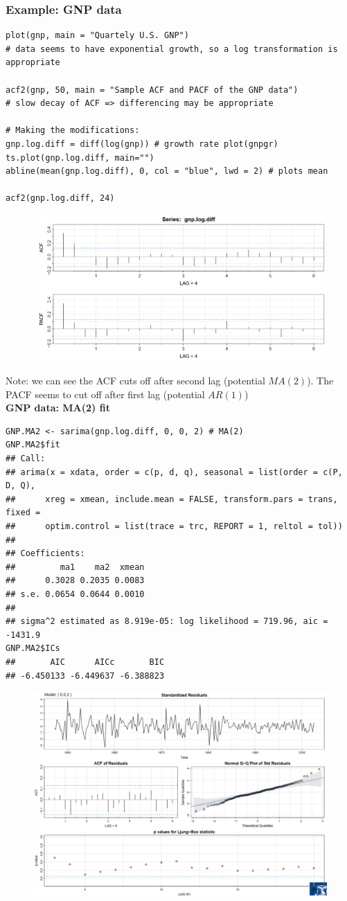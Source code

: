 \documentclass[11pt]{article}
\newcommand{\noi}{\noindent}
\begin{document}
\subsubsection{Example: GNP data}
\begin{lstlisting}
plot(gnp, main = "Quartely U.S. GNP")
# data seems to have exponential growth, so a log transformation is appropriate

acf2(gnp, 50, main = "Sample ACF and PACF of the GNP data")
# slow decay of ACF => differencing may be appropriate

# Making the modifications:
gnp.log.diff = diff(log(gnp)) # growth rate plot(gnpgr)
ts.plot(gnp.log.diff, main="")
abline(mean(gnp.log.diff), 0, col = "blue", lwd = 2) # plots mean

acf2(gnp.log.diff, 24)
\end{lstlisting}
\begin{figure}[H]
    \centering
    \includegraphics[width=0.8\linewidth]{GNP ACF and PACF plot.png}
\end{figure}
\noi Note: we can see the ACF cuts off after second lag (potential $MA(2)$). The PACF seems to cut off after first lag (potential $AR(1)$) \\

\noi \textbf{GNP data: MA(2) fit}
\begin{lstlisting}
GNP.MA2 <- sarima(gnp.log.diff, 0, 0, 2) # MA(2)
GNP.MA2$fit
## Call:
## arima(x = xdata, order = c(p, d, q), seasonal = list(order = c(P, D, Q),
##      xreg = xmean, include.mean = FALSE, transform.pars = trans, fixed =
##      optim.control = list(trace = trc, REPORT = 1, reltol = tol))
##
## Coefficients:
##         ma1    ma2  xmean
##      0.3028 0.2035 0.0083
## s.e. 0.0654 0.0644 0.0010
##
## sigma^2 estimated as 8.919e-05: log likelihood = 719.96, aic = -1431.9
GNP.MA2$ICs
##       AIC      AICc       BIC
## -6.450133 -6.449637 -6.388823
\end{lstlisting}
\begin{figure}[H]
    \centering
    \includegraphics[width=0.7\linewidth]{GNP data MA(2) fit.png}
\end{figure}
\end{document}

